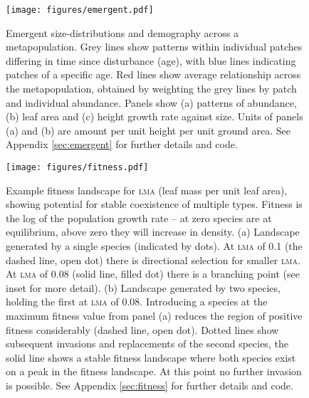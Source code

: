 \documentclass[a4paper,11pt]{article}
\begin{document}
\newpage

\begin{figure}[h!]
\centering
\texttt{[image: figures/emergent.pdf]}
\caption{Emergent size-distributions and demography across a metapopulation.
Grey lines show patterns within individual patches differing in time
since disturbance (age), with blue lines indicating patches of a
specific age. Red lines show average relationship across the metapopulation, 
obtained by weighting the grey lines by patch and individual abundance. 
Panels show (a) patterns of abundance, (b) leaf area and
(c) height growth rate against size. Units of panels (a) and
(b) are amount per unit height per unit ground area.  
See Appendix \ref{sec:emergent} for further details and code.}
\label{fig:emergent}
\end{figure}

\newpage

\begin{figure}[h!]
\centering
\texttt{[image: figures/fitness.pdf]}
\caption{Example fitness landscape for \textsc{lma} (leaf mass per
  unit leaf area), showing potential for stable coexistence of
  multiple types.  Fitness is the log of the population growth rate --
  at zero species are at equilibrium, above zero they will increase in
  density.  (a) Landscape generated by a single species (indicated by
  dots).  At \textsc{lma} of 0.1 (the dashed line, open dot) there is
  directional selection for smaller \textsc{lma}.  At \textsc{lma} of
  0.08 (solid line, filled dot) there is a branching point (see inset
  for more detail).  (b) Landscape generated by two species, holding
  the first at \textsc{lma} of 0.08.  Introducing a species at the
  maximum fitness value from panel (a) reduces the region of positive
  fitness considerably (dashed line, open dot).  Dotted lines show
  subsequent invasions and replacements of the second species, the
  solid line shows a stable fitness landscape where both species exist
  on a peak in the fitness landscape.  At this point no further
  invasion is possible.  See Appendix \ref{sec:fitness} for further
  details and code.}
\label{fig:fitness}
\end{figure}

\clearpage
\setcounter{secnumdepth}{1}
\end{document}
